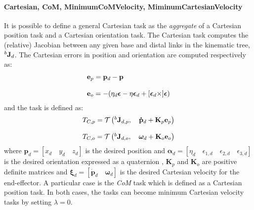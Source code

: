 \paragraph{Cartesian, CoM, MinimumCoMVelocity, MiminumCartesianVelocity}
\label{sec:cartesian_error}
It is possible to define a general Cartesian task as the \emph{aggregate} of a Cartesian position task and a Cartesian orientation task. The Cartesian task computes the (relative) Jacobian between any given base and distal links in the kinematic tree, $^b\mathbf{J}_d$. The Cartesian errors in position and orientation are computed respectively as: 
\begin{equation}
\begin{array}{l}
\mathbf{e}_p = \mathbf{p}_d - \mathbf{p}
\\
\\
\mathbf{e}_o = -(\eta_d \boldsymbol{\epsilon} - \eta \boldsymbol{\epsilon}_d + [\boldsymbol{\epsilon}_d\times] \boldsymbol{\epsilon})
\label{eq:cartesian_error}
\end{array}
\end{equation}
and the task is defined as:
\begin{equation}
\begin{array}{l}
T_{C,p} = \mathcal{T} \left(^b\mathbf{J}_{d,p}, \quad \mathbf{\dot{p}}_d + \mathbf{K}_p\mathbf{e}_p \right)
\\
\\
T_{C,o} = \mathcal{T} \left(^b\mathbf{J}_{d,o}, \quad \boldsymbol{\omega}_d +\mathbf{K}_o\mathbf{e}_o \right)
\label{cartesian_task}
 \end{array}
 \end{equation}
where $\mathbf{p}_d = [x_d \quad y_d \quad z_d]$ is the desired position and $\boldsymbol{\alpha}_d = [\eta_d \quad \epsilon_{1,d} \quad \epsilon_{2,d} \quad \epsilon_{3,d}]$ is the desired orientation expressed as a quaternion \cite{Nakanishi08operationalspace}, $\mathbf{K}_p$ and $\mathbf{K}_o$ are positive definite matrices and $\boldsymbol{\xi}_d = \left[ \boldsymbol{\dot{p}}_d \quad \boldsymbol{\omega}_d \right]$ is the desired Cartesian velocity for the end-effector.
A particular case is the \emph{CoM} task which is defined as a Cartesian position task. 
In both cases, the tasks can become minimum Cartesian velocity tasks by setting $\lambda=0$.

